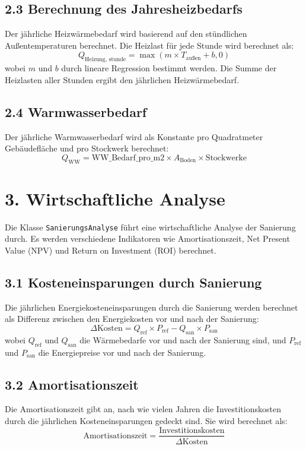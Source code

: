 \documentclass{article}
\begin{document}
\subsection*{2.3 Berechnung des Jahresheizbedarfs}
Der jährliche Heizwärmebedarf wird basierend auf den stündlichen Außentemperaturen berechnet. Die Heizlast für jede Stunde wird berechnet als:
\[
Q_{\text{Heizung, stunde}} = \max(m \times T_{\text{außen}} + b, 0)
\]
wobei \( m \) und \( b \) durch lineare Regression bestimmt werden. Die Summe der Heizlasten aller Stunden ergibt den jährlichen Heizwärmebedarf.

\subsection*{2.4 Warmwasserbedarf}
Der jährliche Warmwasserbedarf wird als Konstante pro Quadratmeter Gebäudefläche und pro Stockwerk berechnet:
\[
Q_{\text{WW}} = \text{WW\_Bedarf\_pro\_m2} \times A_{\text{Boden}} \times \text{Stockwerke}
\]

\section*{3. Wirtschaftliche Analyse}
Die Klasse \texttt{SanierungsAnalyse} führt eine wirtschaftliche Analyse der Sanierung durch. Es werden verschiedene Indikatoren wie Amortisationszeit, Net Present Value (NPV) und Return on Investment (ROI) berechnet.

\subsection*{3.1 Kosteneinsparungen durch Sanierung}
Die jährlichen Energiekosteneinsparungen durch die Sanierung werden berechnet als Differenz zwischen den Energiekosten vor und nach der Sanierung:
\[
\Delta \text{Kosten} = Q_{\text{ref}} \times P_{\text{ref}} - Q_{\text{san}} \times P_{\text{san}}
\]
wobei \( Q_{\text{ref}} \) und \( Q_{\text{san}} \) die Wärmebedarfe vor und nach der Sanierung sind, und \( P_{\text{ref}} \) und \( P_{\text{san}} \) die Energiepreise vor und nach der Sanierung.

\subsection*{3.2 Amortisationszeit}
Die Amortisationszeit gibt an, nach wie vielen Jahren die Investitionskosten durch die jährlichen Kosteneinsparungen gedeckt sind. Sie wird berechnet als:
\[
\text{Amortisationszeit} = \frac{\text{Investitionskosten}}{\Delta \text{Kosten}}
\]
\end{document}
